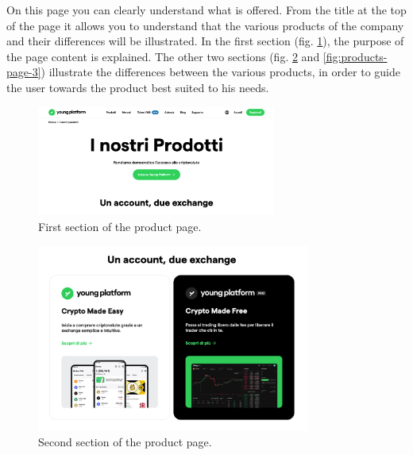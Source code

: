 On this page you can clearly understand what is offered. From the title at 
the top of the page it allows you to understand that the various products 
of the company and their differences will be illustrated. In the first 
section (fig. \ref{fig:products-page-1}), the purpose of the page content 
is explained. The other two sections (fig. \ref{fig:products-page-2} and 
\ref{fig:products-page-3}) illustrate the differences between the various 
products, in order to guide the user towards the product best suited to 
his needs.
\begin{figure}[H]
  \centering
  \includegraphics[width=0.70\textwidth]{res/images/internal-pages/products-page/products-page-1.png}
  \caption{First section of the product page.}
  \label{fig:products-page-1}
\end{figure}

\begin{figure}[H]
  \centering
  \includegraphics[width=0.80\textwidth]{res/images/internal-pages/products-page/products-page-2.png}
  \caption{Second section of the product page.}
  \label{fig:products-page-2}
\end{figure}


